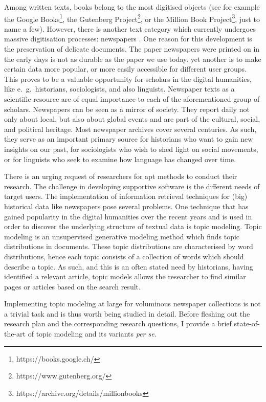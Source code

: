 Among written texts, books belong to the most digitised objects (see for example the Google Books\footnote{https://books.google.ch/}, the Gutenberg Project\footnote{https://www.gutenberg.org/}, or the Million Book Project\footnote{https://archive.org/details/millionbooks}, just to name a few). However, there is another text category which currently undergoes massive digitisation processes: newspapers \citep{lansdall-welfarecontent2017,prestondigital2016,binghamdigitization2010}. One reason for this development is the preservation of delicate documents. The paper newspapers were printed on in the early days is not as durable as the paper we use today. yet another is to make certain data more popular, or more easily accessible for different user groups. This proves to be a valuable opportunity for scholars in the digital humanities, like e.~g.~historians, sociologists, and also linguists. Newspaper texts as a scientific resource are of equal importance to each of the aforementioned group of scholars. Newspapers can be seen as a mirror of society. They report daily not only about local, but also about global events and are part of the cultural, social, and political heritage. Most newspaper archives cover several centuries. As such, they serve as an important primary source for historians who want to gain new insights on our past, for sociologists who wish to shed light on social movements, or for linguists who seek to examine how language has changed over time.

There is an urging request of researchers for apt methods to conduct their research. The challenge in developing supportive software is the different needs of target users. The implementation of information retrieval techniques for (big) historical data like newspapers pose several problems. One technique that has gained popularity in the digital humanities over the recent years and is used in order to discover the underlying structure of textual data is topic modeling. Topic modeling is an unsupervised generative modeling method which finds topic distributions in documents. These topic distributions are characterised by word distributions, hence each topic consists of a collection of words which should describe a topic. As such, and this is an often stated need by historians, having identified a relevant article, topic models allows the researcher to find similar pages or articles based on the search result.

Implementing topic modeling at large for voluminous newspaper collections is not a trivial task and is thus worth being studied in detail. Before fleshing out the research plan and the corresponding research questions, I provide a brief state-of-the-art of topic modeling and its variants \textit{per se}.

